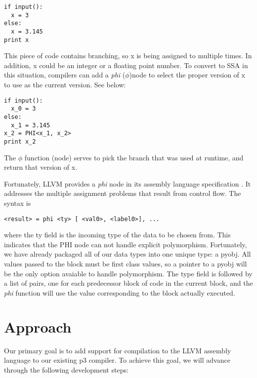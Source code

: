 \documentclass[11pt]{article}
\begin{document}
\begin{verbatim}
if input():
  x = 3
else:
  x = 3.145
print x
\end{verbatim}

This piece of code contains branching, so x is being assigned to
multiple times. In addition, x could be an integer or a floating point
number. To convert to SSA in this situation, compilers can add a
\emph{phi} ($\phi$)node to select the proper version of x to use as
the current version. See below:

\begin{verbatim}
if input():
  x_0 = 3
else:
  x_1 = 3.145
x_2 = PHI<x_1, x_2>
print x_2
\end{verbatim}

The $\phi$ function (node) serves to pick the branch that was used at
runtime, and return that version of x.

Fortunately, LLVM provides a \emph{phi} node in its assembly language
specification \cite{llvm.org}. It addresses the multiple assignment
problems that result from control flow. The syntax is

\begin{verbatim}
<result> = phi <ty> [ <val0>, <label0>], ...
\end{verbatim} 

where the ty field is the incoming type of the data to be chosen
from. This indicates that the PHI node can not handle explicit
polymorphism. Fortunately, we have already packaged all of our data
types into one unique type: a pyobj. All values passed to the block
must be first class values, so a pointer to a pyobj will be the only
option avaiable to handle polymorphism. The type field is followed by
a list of pairs, one for each predecessor block of code in the current
block, and the \emph{phi} function will use the value corresponding to
the block actually executed.

\section{Approach}

Our primary goal is to add support for compilation to the LLVM
assembly language to our existing p3 compiler. To achieve this goal,
we will advance through the following development steps:
\end{document}
